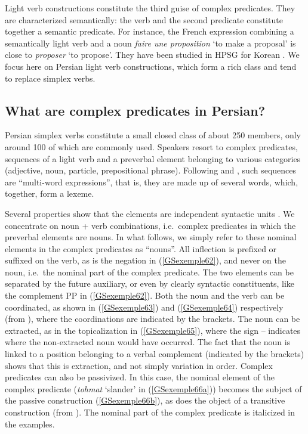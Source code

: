 {Light verb constructions constitute the third guise of complex predicates. They are characterized semantically: the verb and the second predicate constitute together a semantic predicate. For instance, the French expression combining a semantically light verb and a noun \emph{faire une proposition} `to make a proposal’ is close to \emph{proposer} `to propose’. They have been studied in HPSG for Korean \citep{Ryu:93, lee2001argument, choi2001mixed, Kim2016a-u}. We focus here on Persian light verb constructions, which form a rich class and tend to replace simplex verbs.   
    
\subsection{What are complex predicates in Persian?}\label{GSsection5.1}

Persian simplex verbs constitute a small closed class of about 250 members, only around 100 of which are commonly used. Speakers resort to complex predicates, sequences of a light verb and a preverbal element belonging to various categories (adjective, noun, particle, prepositional phrase). Following \cite{bonami2010persian} and \cite{pollet2012grammaire}, such sequences are ``multi-word expressions'', that is, they are made up of several words, which, together, form a lexeme. 

Several properties show that the elements are independent syntactic units \citep{Karimi-Doostan97a, Megerdoomian2002a, pollet2012grammaire}. We concentrate on noun + verb combinations, i.e.\ complex predicates in which the preverbal elements are nouns. In what follows, we simply refer to these nominal elements in the complex predicates as ``nouns''.
All inflection is prefixed or suffixed on the verb, as is the negation in (\ref{GSexemple62}), and never on the noun, i.e.\ the nominal part of the complex predicate. The two elements can be separated by the future auxiliary, or even by clearly syntactic constituents, like the complement PP in (\ref{GSexemple62}). Both the noun and the verb can be coordinated, as shown in (\ref{GSexemple63}) and (\ref{GSexemple64}) respectively (from \citealt[3]{bonami2010persian}), where the coordinations are indicated by the brackets. 
The noun can be extracted, as in the topicalization in (\ref{GSexemple65}), where the sign -- indicates where the non-extracted noun would have occurred. 
The fact that the noun is linked to a position belonging to a verbal complement (indicated by the brackets) shows that this is extraction, and not simply variation in order.
Complex predicates can also be passivized. In this case, the nominal element of the complex predicate (\emph{tohmat} `slander' in (\ref{GSexemple66a})) becomes the subject of the passive construction (\ref{GSexemple66b}), as does the object of a transitive construction (from \citealt[251]{pollet2012grammaire}). The nominal part of the complex predicate is italicized in the examples.

}
